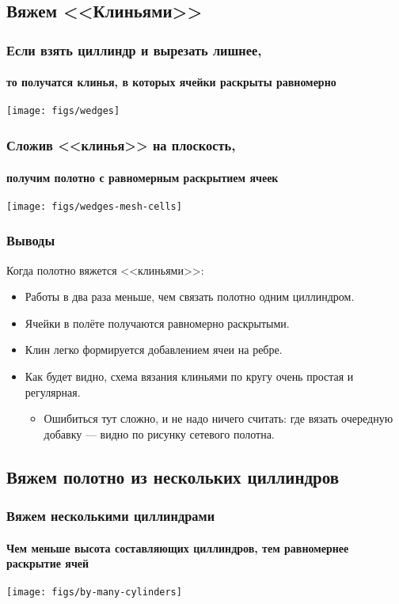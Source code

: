 \subsection{Вяжем <<Клиньями>>}

\begin{frame}
    \frametitle{Если взять циллиндр и вырезать лишнее,}
    \framesubtitle{то получатся клинья, в которых ячейки раскрыты равномерно}

    \begin{center}
        \texttt{[image: figs/wedges]}
    \end{center}
\end{frame}

\begin{frame}
    \frametitle{Сложив <<клинья>> на плоскость,}
    \framesubtitle{получим полотно с равномерным раскрытием ячеек}

    \begin{center}
        \texttt{[image: figs/wedges-mesh-cells]}
    \end{center}
\end{frame}

\begin{frame}
    \frametitle{Выводы}

	Когда полотно вяжется <<клиньями>>:
    \begin{itemize}
        \item Работы в два раза меньше, чем связать полотно одним циллиндром.
        \item Ячейки в полёте получаются равномерно раскрытыми.
		\item Клин легко формируется добавлением ячеи на ребре.
        \item Как будет видно, схема вязания клиньями по кругу очень простая и регулярная. 
		\begin{itemize}
			\item Ошибиться тут сложно, и не надо ничего считать: где вязать очередную добавку --- видно по рисунку сетевого полотна.
		\end{itemize}
    \end{itemize}
\end{frame}


\subsection{Вяжем полотно из нескольких циллиндров}

\begin{frame}
    \frametitle{Вяжем несколькими циллиндрами}
    \framesubtitle{Чем меньше высота составляющих циллиндров, тем равномернее раскрытие ячей}

    \begin{center}
        \texttt{[image: figs/by-many-cylinders]}
    \end{center}
\end{frame}

